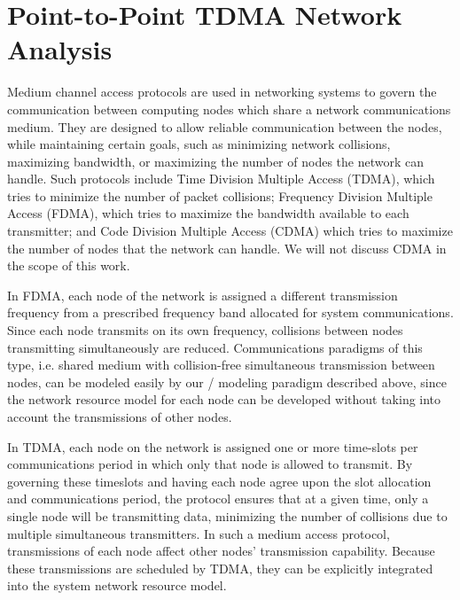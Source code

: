 \newpage

\section{Point-to-Point TDMA Network Analysis}
\label{sec:tdma}

Medium channel access protocols are used in networking systems to
govern the communication between computing nodes which share a network
communications medium.  They are designed to allow reliable
communication between the nodes, while maintaining certain goals, such
as minimizing network collisions, maximizing bandwidth, or maximizing
the number of nodes the network can handle.  Such protocols include
Time Division Multiple Access (TDMA), which tries to minimize the
number of packet collisions; Frequency Division Multiple Access
(FDMA), which tries to maximize the bandwidth available to each
transmitter; and Code Division Multiple Access (CDMA) which tries to
maximize the number of nodes that the network can
handle\cite{jung1993advantagesCDMAFDMATDMA}.  We will not discuss CDMA
in the scope of this work.

In FDMA, each node of the network is assigned a different transmission
frequency from a prescribed frequency band allocated for system
communications.  Since each node transmits on its own frequency,
collisions between nodes transmitting simultaneously are reduced.
Communications paradigms of this type, i.e. shared medium with
collision-free simultaneous transmission between nodes, can be modeled
easily by our \shorttool/ modeling paradigm described above, since the
network resource model for each node can be developed without taking
into account the transmissions of other nodes.

In TDMA, each node on the network is assigned one or more time-slots
per communications period in which only that node is allowed to
transmit.  By governing these timeslots and having each node agree
upon the slot allocation and communications period, the protocol
ensures that at a given time, only a single node will be transmitting
data, minimizing the number of collisions due to multiple simultaneous
transmitters.  In such a medium access protocol, transmissions of each
node affect other nodes' transmission capability.  Because these
transmissions are scheduled by TDMA, they can be explicitly integrated
into the system network resource model.

